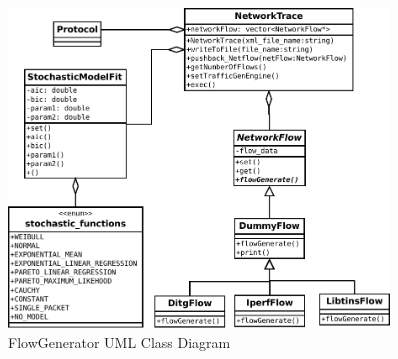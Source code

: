 \clearpage

\begin{figure}[]
	\centering
	\includegraphics[width=0.9\textwidth]{figures/apD/flow-generator}
	\caption{FlowGenerator UML Class Diagram}
	\label{fig:uml-flow-generator}
\end{figure}

